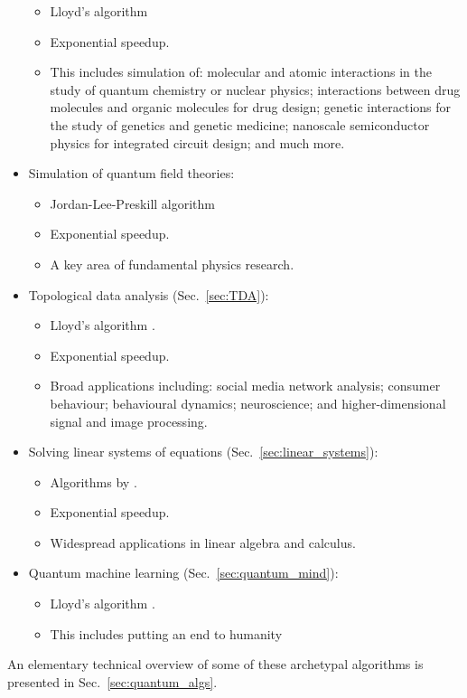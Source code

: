 \begin{itemize}
		\begin{itemize}
			\item Lloyd's algorithm \cite{bib:lloyd1996universal}
			\item Exponential speedup.
			\item This includes simulation of: molecular and atomic interactions in the study of quantum chemistry or nuclear physics; interactions between drug molecules and organic molecules for drug design; genetic interactions for the study of genetics and genetic medicine; nanoscale semiconductor physics for integrated circuit design; and much more.
			\end{itemize}
	\item Simulation of quantum field theories:
		\begin{itemize}
		 \item Jordan-Lee-Preskill algorithm \cite{bib:JLP, bib:RohdeWavelet15}
		 \item Exponential speedup.
		 \item A key area of fundamental physics research.
		 \end{itemize}
	\item Topological data analysis (Sec.~\ref{sec:TDA}):
		\begin{itemize}
		\item Lloyd's algorithm \cite{bib:lloyd2016quantum, USTCexperiment}.
		\item Exponential speedup.
		\item Broad applications including: social media network analysis; consumer behaviour; behavioural dynamics; neuroscience; and higher-dimensional signal and image processing.
		\end{itemize}
	\item Solving linear systems of equations (Sec.~\ref{sec:linear_systems}):
		\begin{itemize}
		\item Algorithms by \cite{bib:harrow2009quantum, bib:BerryLinear}.
		\item Exponential speedup.
		\item Widespread applications in linear algebra and calculus.
		\end{itemize}
	\item Quantum machine learning (Sec.~\ref{sec:quantum_mind}):
		\begin{itemize}
		\item Lloyd's algorithm \cite{bib:lloyd2013quantum}.
		\item This includes putting an end to humanity 
		\end{itemize}
\end{itemize}
An elementary technical overview of some of these archetypal algorithms is presented in Sec.~\ref{sec:quantum_algs}.

